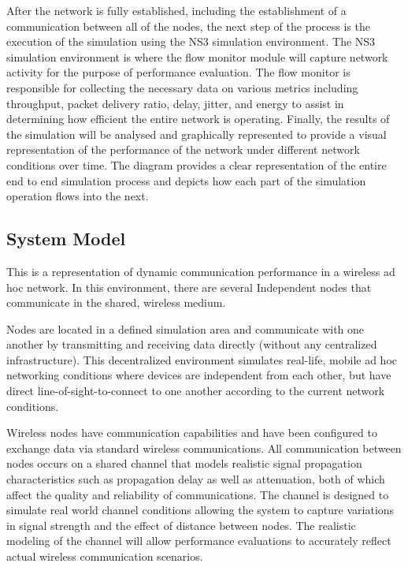 \documentclass[a4paper,fleqn]{cas-dc}
\numberwithin{equation}{section}
\begin{document}
After the network is fully established, including the establishment of a communication between all of the nodes, the next step of the process is the execution of the simulation using the NS3 simulation environment. The NS3 simulation environment is where the flow monitor module will capture network activity for the purpose of performance evaluation. The flow monitor is responsible for collecting the necessary data on various metrics including throughput, packet delivery ratio, delay, jitter, and energy to assist in determining how efficient the entire network is operating. Finally, the results of the simulation will be analysed and graphically represented to provide a visual representation of the performance of the network under different network conditions over time. The diagram provides a clear representation of the entire end to end simulation process and depicts how each part of the simulation operation flows into the next.


\subsection{System Model}

This is a representation of dynamic communication performance in a wireless ad hoc network. In this environment, there are several Independent nodes that communicate in the shared, wireless medium.

Nodes are located in a defined simulation area and communicate with one another by transmitting and receiving data directly (without any centralized infrastructure). This decentralized environment simulates real-life, mobile ad hoc networking conditions where devices are independent from each other, but have direct line-of-sight-to-connect to one another according to the current network conditions.

Wireless nodes have communication capabilities and have been configured to exchange data via standard wireless communications. All communication between nodes occurs on a shared channel that models realistic signal propagation characteristics such as propagation delay as well as attenuation, both of which affect the quality and reliability of communications. The channel is designed to simulate real world channel conditions allowing the system to capture variations in signal strength and the effect of distance between nodes. The realistic modeling of the channel will allow performance evaluations to accurately reflect actual wireless communication scenarios.
\end{document}

